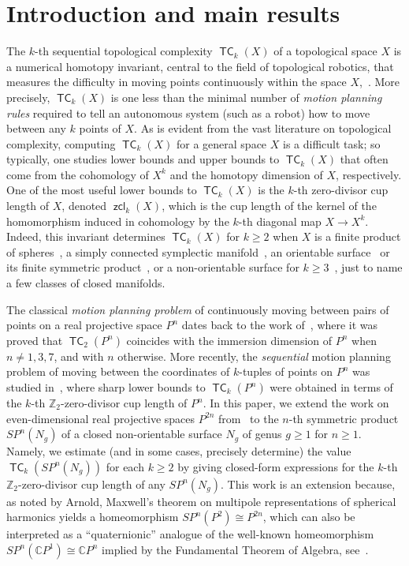 \documentclass[amscd,amssymb,verbatim,10pt]{amsart}
\numberwithin{equation}{section}
\theoremstyle{plain}
\theoremstyle{definition}
\DeclareMathOperator{\TC}{{\mathsf{TC}}}
\DeclareMathOperator{\zcl}{{\mathsf{zcl}}}
\def\C{{\mathbb C}}
\def\Z{{\mathbb Z}}
\begin{document}
\maketitle
\tableofcontents

\section{Introduction and main results}\label{sec: intro}
The $k$-th sequential topological complexity $\TC_k(X)$ of a topological space $X$ is a numerical homotopy invariant, central to the field of topological robotics, that measures the difficulty in moving points continuously within the space $X$,~\cite{Far,Ru}. More precisely, $\TC_k(X)$ is one less than the minimal number of \emph{motion planning rules} required to tell an autonomous system (such as a robot) how to move between any $k$ points of $X$. As is evident from the vast literature on topological complexity, computing $\TC_k(X)$ for a general space $X$ is a difficult task; so typically, one studies lower bounds and upper bounds to $\TC_k(X)$ that often come from the cohomology of $X^k$ and the homotopy dimension of $X$, respectively. One of the most useful lower bounds to $\TC_k(X)$ is the $k$-th zero-divisor cup length of $X$, denoted $\zcl_k(X)$, which is the cup length of the kernel of the homomorphism induced in cohomology by the $k$-th diagonal map $X\to X^k$. Indeed, this invariant determines $\TC_k(X)$ for $k\ge 2$ when $X$ is a finite product of spheres~\cite{Far,BGRT}, a simply connected symplectic manifold~\cite{FTY,BGRT}, an orientable surface~\cite{Far,Ru} or its finite symmetric product~\cite{DCDJ,Ja}, or a non-orientable surface for $k\ge 3$~\cite{GGGL}, just to name a few classes of closed manifolds.

The classical \emph{motion planning problem} of continuously moving between pairs of points on a real projective space $P^n$ dates back to the work of~\cite{FTY}, where it was proved that $\TC_2(P^n)$ coincides with the immersion dimension of $P^n$ when $n\ne 1,3,7$, and with $n$ otherwise. More recently, the \emph{sequential} motion planning problem of moving between the coordinates of $k$-tuples of points on $P^n$ was studied in~\cite{CAG+,Dav}, where sharp lower bounds to $\TC_k(P^n)$ were obtained in terms of the $k$-th $\Z_2$-zero-divisor cup length of $P^n$. In this paper, we extend the work on even-dimensional real projective spaces $P^{2n}$ from~\cite{Dav} to the $n$-th symmetric product $SP^n(N_g)$ of a closed non-orientable surface $N_g$ of genus $g\ge 1$ for $n\ge 1$. Namely, we estimate (and in some cases, precisely determine) the value $\TC_k(SP^n(N_g))$ for each $k\ge 2$ by giving closed-form expressions for the $k$-th $\Z_2$-zero-divisor cup length of any $SP^n(N_g)$. This work is an extension because, as noted by Arnold, Maxwell's theorem on multipole representations of spherical harmonics yields a homeomorphism $SP^n(P^2)\cong P^{2n}$, which can also be interpreted as a ``quaternionic'' analogue of the well-known homeomorphism $SP^n(\C P^1)\cong \C P^n$ implied by the Fundamental Theorem of Algebra, see~\cite{BGZ,KS}.
\end{document}
